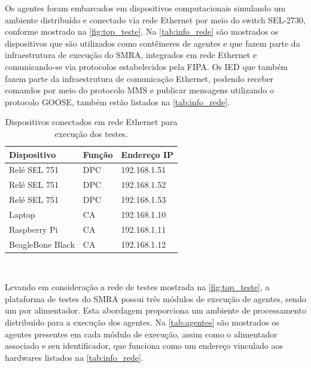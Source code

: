 \documentclass[journal]{IEEEtran}
\begin{document}
Os agentes foram embarcados em dispositivos computacionais  simulando um ambiente distribuído e conectado via rede Ethernet por meio do switch SEL-2730, conforme mostrado na \autoref{fig:top_teste}. Na \autoref{tab:info_rede} são mostrados os dispositivos que são utilizados como contêineres de agentes e que fazem parte da infraestrutura de execução do SMRA, integrados em rede Ethernet e comunicando-se via protocolos estabelecidos pela FIPA. Os IED que também fazem parte da infraestrutura de comunicação Ethernet, podendo receber comandos por meio do protocolo MMS e publicar mensagens utilizando o protocolo GOOSE, também estão listados na \autoref{tab:info_rede}.

\begin{table}[htb]
    \centering
    \caption{\label{tab:info_rede} Dispositivos conectados em rede Ethernet para execução dos testes.}
    \begin{tabular}{p{1.0in}p{0.5in}p{1.0in}}
        \toprule
        Dispositivo & Função & Endereço IP \\[0.1in]
        \midrule
        \midrule
        Relé SEL 751 & DPC & 192.168.1.51 \\
        \midrule
        Relé SEL 751 & DPC & 192.168.1.52 \\
        \midrule
        Relé SEL 751 & DPC & 192.168.1.53 \\
        \midrule
        Laptop & CA & 192.168.1.10 \\
        \midrule
        Raspberry Pi & CA & 192.168.1.11 \\
        \midrule
        BeagleBone Black & CA & 192.168.1.12 \\
        \bottomrule
    \end{tabular}
    \\[0.1in]
\end{table}

Levando em consideração a rede de testes mostrada na \autoref{fig:top_teste}, a plataforma de testes do SMRA possui três módulos de execução de agentes, sendo um por alimentador. Esta abordagem proporciona um ambiente de processamento distribuído para a execução dos agentes. Na \autoref{tab:agentes} são mostrados os agentes presentes em cada módulo de execução, assim como o alimentador associado e seu identificador, que funciona como um endereço vinculado aos hardwares listados na \autoref{tab:info_rede}.
\end{document}
